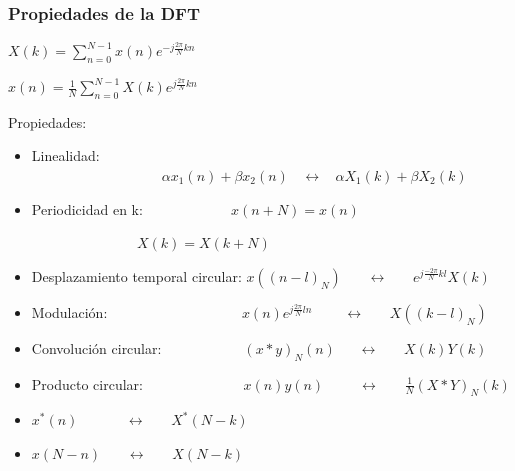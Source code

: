 \begin{frame}
\frametitle{Propiedades de la DFT}

\small
\hspace{3cm}\alert{\footnotesize $X(k)= \sum_{n=0}^{N-1} x(n) e^{-j\frac{2\pi}{N}kn} $}

\vspace{0.1cm} 
 
\hspace{3cm} \alert{\footnotesize  $x(n)=\frac{1}{N} \sum_{n=0}^{N-1} X(k)  e^{j\frac{2\pi}{N}kn}$}

\vspace{0.2cm}

Propiedades:

\vspace{-0.2cm} 

\begin{itemize}
\footnotesize
\item Linealidad: $\:\:\:\:\:\:\:\:\:\:\:\:\:\:\:\:\:\:\:\:\:\:\:\: \:\:\:\:\:\:\:\:\:\:\:\: \:\:\: \:\:\:\alpha x_1(n)+\beta x_2(n) \:\:\:\: \leftrightarrow  \:\:\:\:\alpha X_1(k)+ \beta X_2(k)$
\item Periodicidad en k: $\:\:\:\:\:\:\:\:\:\:\:\:\:\:\:\:\:\:\:\:\:\:\:\:\:\:\:x(n+N)=x(n)$

\hspace{2cm}$\:\: \:\:\:\:\:\:\:\: \:\:\:\:\:\:\:\: \:\:\:\:\:\:\:\: \:\:\:\:\:\:\:\: X(k)=X(k+N)$

\item Desplazamiento temporal circular: $x((n-l)_N)  \:\:\:\:\:\:\:\: \leftrightarrow   \:\:\:\:\:\:\:\: e^{j\frac{-2\pi}{N}kl}X(k)$
\item Modulación:   $\:\: \:\:\:\:\:\:\:\:\:\:\:\:\:\:\:\:  \:\:\:\:\:\:\:\: \:\:\:\:\:\:\:\:\:\:\:\:\:\:\:\: x(n)e^{j\frac{2\pi}{N}ln}\:\: \:\:\:\:\:\:\:\:  \leftrightarrow \:\:\:\:\:\:\:\: X((k-l)_{N}) $
\item Convolución circular: $\:\:\:\:\:\:\:\:\:\:\:\:\:\:\:\:\:\:\:\:\:\:\:\:\: (x*y)_{N}(n) \:\:\:\:\:\:\:  \leftrightarrow \:\:\:\:\:\:\:\:   X(k)Y(k)$
\item Producto circular: $\:\:\:\:\:\:\:\:\:\:\:\:\:\:\:\:\:\:\:\:\:\:\:\:\:\:\:\:\:\:\: x(n)y(n)   \:\:\: \:\:\:\:\:\:\:\:  \leftrightarrow \:\:\:\:\:\:\:\:  \frac{1}{N}(X*Y)_{N}(k)$

\item $x^*(n) \:\:\:\:\:\:\:\:\:\:\:\:\:\:\:\leftrightarrow \:\:\:\:\:\:\:\:X^*(N-k)$

\item  $x(N-n)  \:\:\:\:\:\:\:\:    \leftrightarrow   \:\:\:\:\:\:\:\:  X(N-k)$

\end{itemize}
\end{frame}


